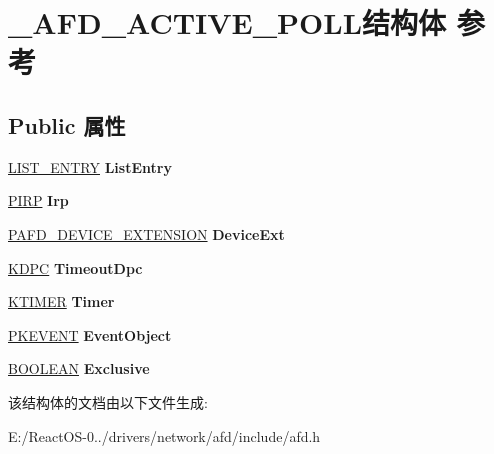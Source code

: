 \hypertarget{struct___a_f_d___a_c_t_i_v_e___p_o_l_l}{}\section{\+\_\+\+A\+F\+D\+\_\+\+A\+C\+T\+I\+V\+E\+\_\+\+P\+O\+L\+L结构体 参考}
\label{struct___a_f_d___a_c_t_i_v_e___p_o_l_l}
\subsection*{Public 属性}
\begin{DoxyCompactItemize}
\item 
\mbox{\label{struct___a_f_d___a_c_t_i_v_e___p_o_l_l_a9e1848cd6ba58253efde13d33164775f}} 
\hyperlink{struct___l_i_s_t___e_n_t_r_y}{L\+I\+S\+T\+\_\+\+E\+N\+T\+RY} {\bfseries List\+Entry}
\item 
\mbox{\label{struct___a_f_d___a_c_t_i_v_e___p_o_l_l_a708de816378dfbc44c74b5a5ee68326c}} 
\hyperlink{interfacevoid}{P\+I\+RP} {\bfseries Irp}
\item 
\mbox{\label{struct___a_f_d___a_c_t_i_v_e___p_o_l_l_ab51f081bfcd09434b182b1cb9918ef45}} 
\hyperlink{struct___a_f_d___d_e_v_i_c_e___e_x_t_e_n_s_i_o_n}{P\+A\+F\+D\+\_\+\+D\+E\+V\+I\+C\+E\+\_\+\+E\+X\+T\+E\+N\+S\+I\+ON} {\bfseries Device\+Ext}
\item 
\mbox{\label{struct___a_f_d___a_c_t_i_v_e___p_o_l_l_a86f83e69a0ef8ac4348c2b905ea6293d}} 
\hyperlink{struct___k_d_p_c}{K\+D\+PC} {\bfseries Timeout\+Dpc}
\item 
\mbox{\label{struct___a_f_d___a_c_t_i_v_e___p_o_l_l_aa02b3b1a6932f85c2d2498c4ce11b7e4}} 
\hyperlink{struct___k_t_i_m_e_r}{K\+T\+I\+M\+ER} {\bfseries Timer}
\item 
\mbox{\label{struct___a_f_d___a_c_t_i_v_e___p_o_l_l_a91548679a356a07ef970c75a1303a272}} 
\hyperlink{struct___k_e_v_e_n_t}{P\+K\+E\+V\+E\+NT} {\bfseries Event\+Object}
\item 
\mbox{\label{struct___a_f_d___a_c_t_i_v_e___p_o_l_l_ab606f30d89403d58c3bad1db5635ba8b}} 
\hyperlink{_processor_bind_8h_a112e3146cb38b6ee95e64d85842e380a}{B\+O\+O\+L\+E\+AN} {\bfseries Exclusive}
\end{DoxyCompactItemize}


该结构体的文档由以下文件生成\+:\begin{DoxyCompactItemize}
\item 
E\+:/\+React\+O\+S-\/0../drivers/network/afd/include/afd.\+h\end{DoxyCompactItemize}
